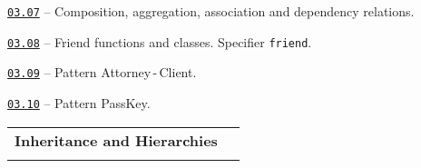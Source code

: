 \documentclass[a4paper,12pt]{article}
\renewenvironment{itemize}
{
    \begin{list}{\labelitemi}
    {
      \setlength{\topsep}{0pt}
      \setlength{\partopsep}{0pt}
      \setlength{\parskip}{0pt}
      \setlength{\itemsep}{0pt}
      \setlength{\parsep}{0pt}
      \setlength{\leftmargin}{14.5pt}
    }
}{\end{list}}
\begin{document}
\medskip\smallskip

\begin{itemize}

    \item \href{https://github.com/i-s-m-mipt/Education/blob/master/projects/examples/source/03.07.cpp}{\texttt{03.07}} -- Composition, aggregation, association and dependency relations.

    \smallskip

    \item \href{https://github.com/i-s-m-mipt/Education/blob/master/projects/examples/source/03.08.cpp}{\texttt{03.08}} -- Friend functions and classes. Specifier \lstinline{friend}.

    \smallskip

    \item \href{https://github.com/i-s-m-mipt/Education/blob/master/projects/examples/source/03.09.cpp}{\texttt{03.09}} -- Pattern Attorney\,-\,Client.

    \smallskip

    \item \href{https://github.com/i-s-m-mipt/Education/blob/master/projects/examples/source/03.10.cpp}{\texttt{03.10}} -- Pattern PassKey.

\end{itemize}

\bigskip\medskip

\begin{tabular}{!{\vrule width 1pt}L{5.4cm}!{\vrule width 1pt}L{13.6cm}!{\vrule width 0pt}} 


\textbf{Inheritance and Hierarchies} & \\


\end{tabular}

\medskip\smallskip
\end{document}
